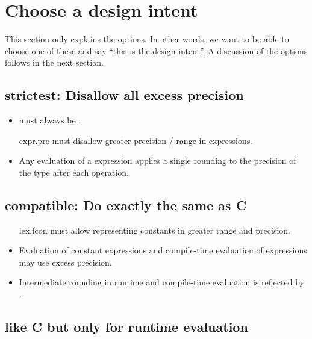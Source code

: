 \section{Choose a design intent}

This section only explains the options.
In other words, we want to be able to choose one of these and say “this is the
design intent”.
A discussion of the options follows in the next section.

\subsection{strictest: Disallow all excess precision}\label{o:1}

\begin{itemize}
  \item {} must always be .

  \item [expr.pre] must disallow greater precision / range in \fp expressions.

  \item Any evaluation of a \fp expression applies a single rounding to the
    precision of the \fp type after each operation.
\end{itemize}

\subsection{compatible: Do exactly the same as C}\label{o:2}

\begin{itemize}
  \item [lex.fcon] must allow representing \fp constants in greater range and
    precision.

  \item Evaluation of constant expressions and compile-time evaluation of
    expressions may use excess precision.

  \item Intermediate rounding in runtime and compile-time evaluation is
    reflected by .
\end{itemize}

\subsection{like C but only for runtime evaluation}\label{o:3}

